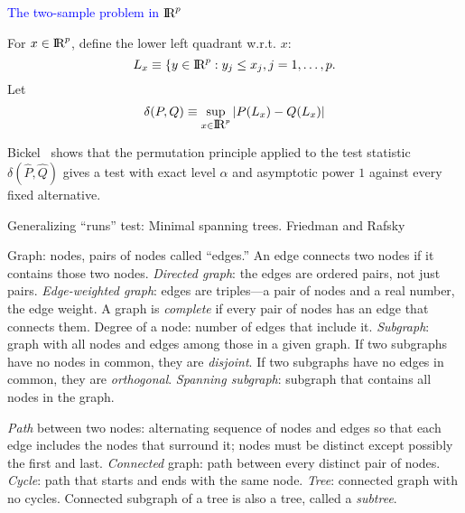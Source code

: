 \documentclass[landscape]{slides}
\def\Real{\hbox{I\kern-.17em\hbox{R}}}
\newcommand{\bfR}{\Real}
\newcommand{\beq}{\begin{equation}}
\newcommand{\eeq}{\end{equation}}
\begin{document}
\begin{slide}
\begin{slide}
\end{slide}

\begin{slide}
{\textcolor{blue}{The two-sample problem in $\bfR^p$}}

For $x \in \bfR^p$, define the lower left quadrant w.r.t. $x$:
\beq
    L_x \equiv \{ y \in \bfR^p : y_j \le x_j, j = 1, \ldots, p.
\eeq
Let
\beq
    \delta(P, Q) \equiv \sup_{x \in \bfR^p} | P(L_x) - Q(L_x) |
\eeq

Bickel~\cite{bickel69} shows that the permutation 
principle applied to the test statistic $\delta(\hat{P},\hat{Q})$ 
gives a test with exact level $\alpha$
and asymptotic power $1$ against every fixed alternative.

\end{slide}

\begin{slide}
Generalizing ``runs'' test: Minimal spanning trees. Friedman and Rafsky~\cite{friedmanRafsky79}

Graph: nodes, pairs of nodes called ``edges.''  An edge connects two nodes if it contains those
two nodes.
{\em Directed graph\/}: the edges are ordered pairs, not just pairs.
{\em Edge-weighted graph\/}: edges are triples---a pair of nodes and a real number, the edge weight.
A graph is {\em complete\/} if every pair of nodes has an edge that connects them.
Degree of a node: number of edges that include it.
{\em Subgraph\/}: graph with all nodes and edges among those in a given graph.
If two subgraphs have no nodes in common, they are {\em disjoint\/}.
If two subgraphs have no edges in common, they are {\em orthogonal\/}.
{\em Spanning subgraph\/}: subgraph that contains all nodes in the graph.

\end{slide}

\begin{slide}

{\em Path\/} between two nodes: alternating sequence of nodes and edges so that 
each edge includes the nodes that surround it; nodes must be distinct 
except possibly the first and last.
{\em Connected\/} graph: path between every distinct pair of nodes.
{\em Cycle\/}: path that starts and ends with the same node.
{\em Tree\/}: connected graph with no cycles.
Connected subgraph of a tree is also a tree, called a {\em subtree\/}.


\end{slide}
\end{slide}
\end{document}
